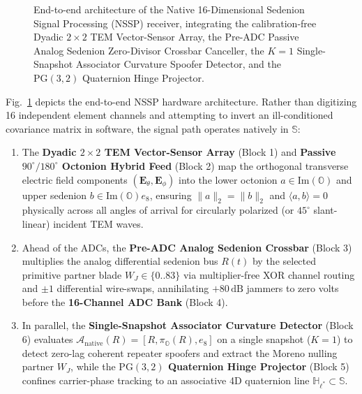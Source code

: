 \documentclass[journal,twoside]{IEEEtran}
\theoremstyle{definition}
\theoremstyle{remark}
\newcommand{\Ha}{\mathbb{H}}
\newcommand{\Oc}{\mathbb{O}}
\newcommand{\Se}{\mathbb{S}}
\newcommand{\PG}{\mathrm{PG}}
\newcommand{\ImPart}{\mathrm{Im}}
\newcommand{\Anative}{\mathcal{A}_{\mathrm{native}}}
\begin{document}
\begin{figure}[!t]
{%
}
\caption{End-to-end architecture of the Native 16-Dimensional Sedenion Signal Processing (NSSP) receiver, integrating the calibration-free Dyadic $2\times 2$ TEM Vector-Sensor Array, the Pre-ADC Passive Analog Sedenion Zero-Divisor Crossbar Canceller, the $K=1$ Single-Snapshot Associator Curvature Spoofer Detector, and the $\PG(3,2)$ Quaternion Hinge Projector.}
\label{fig:system_arch}
\end{figure}

Fig.~\ref{fig:system_arch} depicts the end-to-end NSSP hardware architecture. Rather than digitizing 16 independent element channels and attempting to invert an ill-conditioned covariance matrix in software, the signal path operates natively in $\Se$:
\begin{enumerate}
    \item The \textbf{Dyadic $2\times 2$ TEM Vector-Sensor Array} (Block 1) and \textbf{Passive $90^\circ/180^\circ$ Octonion Hybrid Feed} (Block 2) map the orthogonal transverse electric field components $(\bm{E}_\theta, \bm{E}_\phi)$ into the lower octonion $a \in \ImPart(\Oc)$ and upper sedenion $b \in \ImPart(\Oc)e_8$, ensuring $\|a\|_2 = \|b\|_2$ and $\langle a,b\rangle = 0$ physically across all angles of arrival for circularly polarized (or $45^\circ$ slant-linear) incident TEM waves.
    \item Ahead of the ADCs, the \textbf{Pre-ADC Analog Sedenion Crossbar} (Block 3) multiplies the analog differential sedenion bus $R(t)$ by the selected primitive partner blade $W_J \in \{0..83\}$ via multiplier-free XOR channel routing and $\pm 1$ differential wire-swaps, annihilating $+80\,\mathrm{dB}$ jammers to zero volts before the \textbf{16-Channel ADC Bank} (Block 4).
    \item In parallel, the \textbf{Single-Snapshot Associator Curvature Detector} (Block 6) evaluates $\Anative(R) = [R, \pi_{\Oc}(R), e_8]$ on a single snapshot ($K=1$) to detect zero-lag coherent repeater spoofers and extract the Moreno nulling partner $W_J$, while the \textbf{$\PG(3,2)$ Quaternion Hinge Projector} (Block 5) confines carrier-phase tracking to an associative 4D quaternion line $\Ha_{\ell^*} \subset \Se$.
\end{enumerate}
\end{document}
